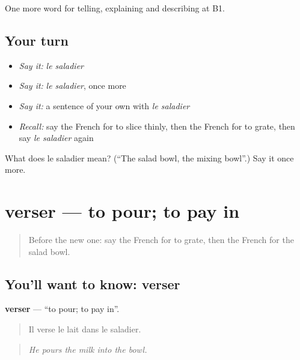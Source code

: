 \begin{grammarlens}[title={What you've built}]
One more word for telling, explaining and describing at B1.
\end{grammarlens}

\subsection*{Your turn}
\begin{itemize}
\raggedright
  \item \emph{Say it:} \emph{le saladier}
  \item \emph{Say it:} \emph{le saladier}, once more
  \item \emph{Say it:} a sentence of your own with \emph{le saladier}
  \item \emph{Recall:} say the French for to slice thinly, then the French for to grate, then say \emph{le saladier} again
\end{itemize}

\begin{tcolorbox}[breakable,colback=teal!4,colframe=teal!35!black,title={Before you move on}]
What does le saladier mean? (\textquotedblleft{}The salad bowl, the mixing bowl\textquotedblright{}.) Say it once more.
\end{tcolorbox}
\section[verser]{verser — to pour; to pay in}

\label{lesson:FR-C329-verser}



\begin{quote}
Before the new one: say the French for to grate, then the French for the salad bowl.
\end{quote}

\subsection*{You'll want to know: verser}
\textbf{verser} — \textquotedblleft{}to pour; to pay in\textquotedblright{}.

\begin{quote}
Il verse le lait dans le saladier.
\end{quote}

\begin{quote}
\emph{He pours the milk into the bowl.}
\end{quote}

